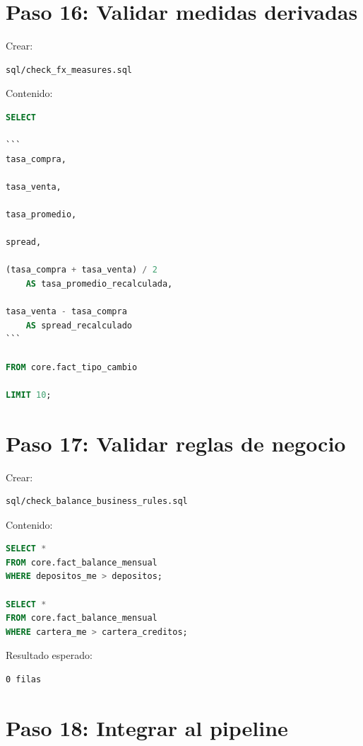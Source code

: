 \section{Paso 16: Validar medidas derivadas}

Crear:

\begin{verbatim}
sql/check_fx_measures.sql
\end{verbatim}

Contenido:

\begin{lstlisting}[language=SQL]
SELECT

```
tasa_compra,

tasa_venta,

tasa_promedio,

spread,

(tasa_compra + tasa_venta) / 2
    AS tasa_promedio_recalculada,

tasa_venta - tasa_compra
    AS spread_recalculado
```

FROM core.fact_tipo_cambio

LIMIT 10;
\end{lstlisting}

\section{Paso 17: Validar reglas de negocio}

Crear:

\begin{verbatim}
sql/check_balance_business_rules.sql
\end{verbatim}

Contenido:

\begin{lstlisting}[language=SQL]
SELECT *
FROM core.fact_balance_mensual
WHERE depositos_me > depositos;

SELECT *
FROM core.fact_balance_mensual
WHERE cartera_me > cartera_creditos;
\end{lstlisting}

Resultado esperado:

\begin{verbatim}
0 filas
\end{verbatim}

\section{Paso 18: Integrar al pipeline}

